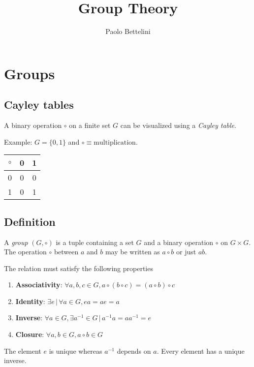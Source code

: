 \documentclass[a4paper]{article}
\title{Group Theory}
\author{Paolo Bettelini}
\date{}
\begin{document}
\maketitle
\tableofcontents
\pagebreak

\section{Groups}

\subsection{Cayley tables}

A binary operation \(\circ\) on a finite set \(G\) can be
visualized using a \textit{Cayley table}.

Example: \(G=\{0,1\}\) and \(\circ \equiv \text{multiplication}\).
\begin{tabular}{|c|c|c|}
    \hline
    \(\circ\) & 0 & 1 \\
    \hline
    0 & 0 & 0 \\
    \hline
    1 & 0 & 1 \\
    \hline
\end{tabular}

\subsection{Definition}

A \textit{group} \((G,\circ)\) is a tuple containing a set \(G\) and
a binary operation \(\circ\) on \(G \times G\).
The operation \(\circ\) between \(a\) and \(b\) may be written as
\(a\circ b\) or just \(ab\).

The relation must satisfy the following properties

\begin{enumerate}
    \item \textbf{Associativity}: \(\forall a,b,c\in G, a \circ (b \circ c) = (a \circ b) \circ c\)
    \item \textbf{Identity}: \(\exists e \,|\, \forall a \in G, ea=ae=a\) 
    \item \textbf{Inverse}: \(\forall a \in G, \exists a^{-1} \in G \,|\, a^{-1}a = aa^{-1} = e\)
    \item \textbf{Closure}: \(\forall a,b\in G, a \circ b \in G\)
\end{enumerate}

The element \(e\) is unique whereas \(a^{-1}\) depends on \(a\). Every
element has a unique inverse.
\end{document}

